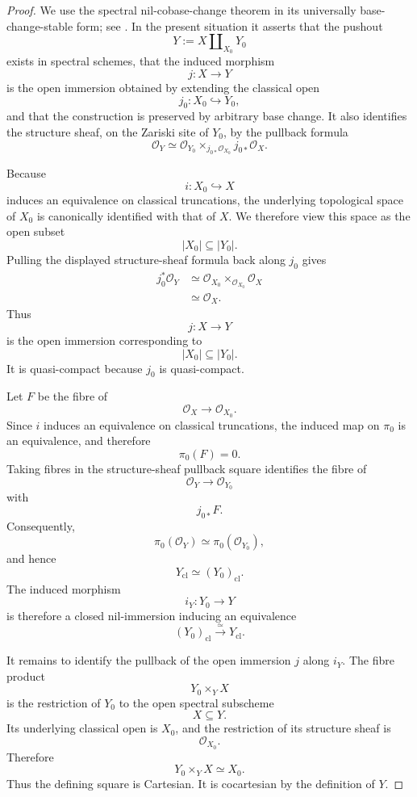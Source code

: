 \begin{proof}
We use the spectral nil-cobase-change theorem in its universally
base-change-stable form; see
\cite{SpectralNilCobaseChange}.  In the present situation it asserts that
the pushout
\[
    Y
    :=
    X\amalg_{X_0}Y_0
\]
exists in spectral schemes, that the induced morphism
\[
    j:X\longrightarrow Y
\]
is the open immersion obtained by extending the classical open
\[
    j_0:X_0\hookrightarrow Y_0,
\]
and that the construction is preserved by arbitrary base change.  It also
identifies the structure sheaf, on the Zariski site of \(Y_0\), by the
pullback formula
\[
    \mathcal O_Y
    \simeq
    \mathcal O_{Y_0}
    \times_{j_{0*}\mathcal O_{X_0}}
    j_{0*}\mathcal O_X.
\]

Because
\[
    i:X_0\hookrightarrow X
\]
induces an equivalence on classical truncations, the underlying topological
space of \(X_0\) is canonically identified with that of \(X\).  We therefore
view this space as the open subset
\[
    |X_0|\subseteq|Y_0|.
\]
Pulling the displayed structure-sheaf formula back along \(j_0\) gives
\[
\begin{aligned}
    j_0^*\mathcal O_Y
    &\simeq
    \mathcal O_{X_0}
    \times_{\mathcal O_{X_0}}
    \mathcal O_X \\
    &\simeq
    \mathcal O_X.
\end{aligned}
\]
Thus
\[
    j:X\longrightarrow Y
\]
is the open immersion corresponding to
\[
    |X_0|\subseteq|Y_0|.
\]
It is quasi-compact because \(j_0\) is quasi-compact.

Let \(F\) be the fibre of
\[
    \mathcal O_X
    \longrightarrow
    \mathcal O_{X_0}.
\]
Since \(i\) induces an equivalence on classical truncations, the induced map
on \(\pi_0\) is an equivalence, and therefore
\[
    \pi_0(F)=0.
\]
Taking fibres in the structure-sheaf pullback square identifies the fibre of
\[
    \mathcal O_Y
    \longrightarrow
    \mathcal O_{Y_0}
\]
with
\[
    j_{0*}F.
\]
Consequently,
\[
    \pi_0(\mathcal O_Y)
    \simeq
    \pi_0(\mathcal O_{Y_0}),
\]
and hence
\[
    Y_{\mathrm{cl}}
    \simeq
    (Y_0)_{\mathrm{cl}}.
\]
The induced morphism
\[
    i_Y:Y_0\longrightarrow Y
\]
is therefore a closed nil-immersion inducing an equivalence
\[
    (Y_0)_{\mathrm{cl}}
    \xrightarrow{\simeq}
    Y_{\mathrm{cl}}.
\]

It remains to identify the pullback of the open immersion \(j\) along
\(i_Y\).  The fibre product
\[
    Y_0\times_YX
\]
is the restriction of \(Y_0\) to the open spectral subscheme
\[
    X\subseteq Y.
\]
Its underlying classical open is \(X_0\), and the restriction of its
structure sheaf is
\[
    \mathcal O_{X_0}.
\]
Therefore
\[
    Y_0\times_YX
    \simeq
    X_0.
\]
Thus the defining square is Cartesian.  It is cocartesian by the definition
of \(Y\).


\end{proof}
